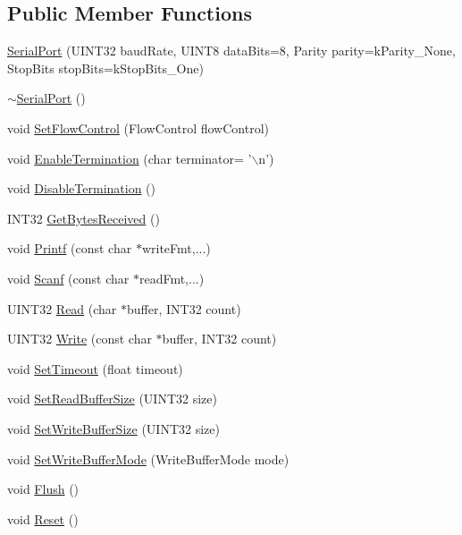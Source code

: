\subsection*{\-Public \-Member \-Functions}
\begin{DoxyCompactItemize}
\item 
\hyperlink{classSerialPort_a52c48c5f1dd124a65008640efd4d1cd6}{\-Serial\-Port} (\-U\-I\-N\-T32 baud\-Rate, \-U\-I\-N\-T8 data\-Bits=8, \-Parity parity=k\-Parity\-\_\-\-None, \-Stop\-Bits stop\-Bits=k\-Stop\-Bits\-\_\-\-One)
\item 
\hyperlink{classSerialPort_a8e09f366ed9b26b0456b66ae7bd8c702}{$\sim$\-Serial\-Port} ()
\item 
void \hyperlink{classSerialPort_ad1163b360e467c7c49fcd8467f8d30ad}{\-Set\-Flow\-Control} (\-Flow\-Control flow\-Control)
\item 
void \hyperlink{classSerialPort_a90e27c4191d7ac4e46c614f562505b68}{\-Enable\-Termination} (char terminator= '$\backslash$n')
\item 
void \hyperlink{classSerialPort_a347f5209ef059b6e53dbf5aaa397e3ac}{\-Disable\-Termination} ()
\item 
\-I\-N\-T32 \hyperlink{classSerialPort_aa6894f04f38d747737b3c4dc721c03ea}{\-Get\-Bytes\-Received} ()
\item 
void \hyperlink{classSerialPort_a7e6079639bb99639ab7b89353a55ed28}{\-Printf} (const char $\ast$write\-Fmt,...)
\item 
void \hyperlink{classSerialPort_a59c35256ee16b2afa2012e2dbd7f5c20}{\-Scanf} (const char $\ast$read\-Fmt,...)
\item 
\-U\-I\-N\-T32 \hyperlink{classSerialPort_af414526bcb7b6b227d3efcb8a37c7bdc}{\-Read} (char $\ast$buffer, \-I\-N\-T32 count)
\item 
\-U\-I\-N\-T32 \hyperlink{classSerialPort_a95e5422930b1f9c90e3857a973d9170e}{\-Write} (const char $\ast$buffer, \-I\-N\-T32 count)
\item 
void \hyperlink{classSerialPort_aa3ad209dd5ab32427fccf711b476d8bf}{\-Set\-Timeout} (float timeout)
\item 
void \hyperlink{classSerialPort_af361b5d5d045d6d36df507a3006c7cb1}{\-Set\-Read\-Buffer\-Size} (\-U\-I\-N\-T32 size)
\item 
void \hyperlink{classSerialPort_a819775c096d0a679d0aad4ee420413a4}{\-Set\-Write\-Buffer\-Size} (\-U\-I\-N\-T32 size)
\item 
void \hyperlink{classSerialPort_a1fd9a6370da04fee0bdc978d04a95c78}{\-Set\-Write\-Buffer\-Mode} (\-Write\-Buffer\-Mode mode)
\item 
void \hyperlink{classSerialPort_aea93ced7190870183d46f7aa303b45f6}{\-Flush} ()
\item 
void \hyperlink{classSerialPort_ab00d8ab877678575767459e9166f775d}{\-Reset} ()
\end{DoxyCompactItemize}


